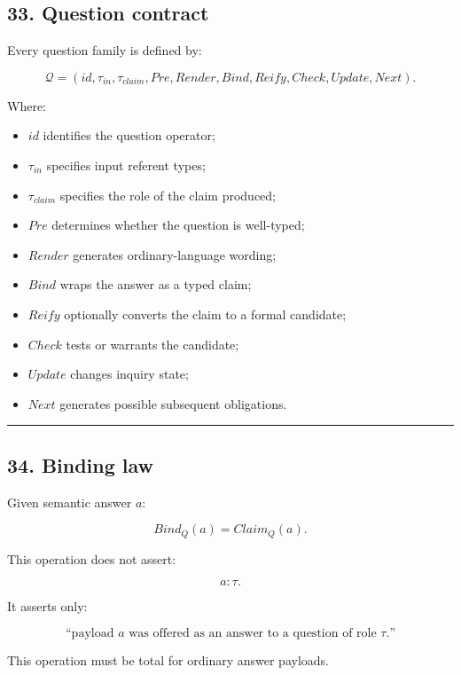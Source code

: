 \documentclass[
]{article}
\providecommand{\tightlist}{%
  \setlength{\itemsep}{0pt}\setlength{\parskip}{0pt}}
\begin{document}
\subsection{33. Question contract}\label{question-contract}

Every question family is defined by:

\[
\boxed{
\mathcal Q
=
(
id,
\tau_{in},
\tau_{claim},
Pre,
Render,
Bind,
Reify,
Check,
Update,
Next
).
}
\]

Where:

\begin{itemize}
\tightlist
\item
  \(id\) identifies the question operator;
\item
  \(\tau_{in}\) specifies input referent types;
\item
  \(\tau_{claim}\) specifies the role of the claim produced;
\item
  \(Pre\) determines whether the question is well-typed;
\item
  \(Render\) generates ordinary-language wording;
\item
  \(Bind\) wraps the answer as a typed claim;
\item
  \(Reify\) optionally converts the claim to a formal candidate;
\item
  \(Check\) tests or warrants the candidate;
\item
  \(Update\) changes inquiry state;
\item
  \(Next\) generates possible subsequent obligations.
\end{itemize}

\begin{center}\rule{0.5\linewidth}{0.5pt}\end{center}

\subsection{34. Binding law}\label{binding-law}

Given semantic answer \(a\):

\[
\boxed{
Bind_Q(a)
=
Claim_Q(a).
}
\]

This operation does not assert:

\[
a:\tau.
\]

It asserts only:

\[
\boxed{
\text{“payload }a\text{ was offered as an answer to a question of role }\tau.”}
\]

This operation must be total for ordinary answer payloads.
\end{document}
